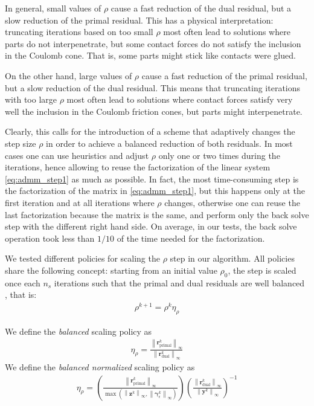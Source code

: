 \documentclass[final,3p]{elsarticle}
\newcommand{\vect}[1]{\bm{#1}}
\newcommand{\norm}[1]{\left\lVert#1\right\rVert}
\begin{document}
In general, small values of $\rho$ cause a fast reduction of the dual residual, but a slow reduction of the primal residual. This has a  physical interpretation: truncating iterations based on too small $\rho$ most often lead to solutions where parts do not interpenetrate, but some contact forces do not satisfy the inclusion in the Coulomb cone. That is, some parts might stick like contacts were glued.

On the other hand, large values of $\rho$ cause a fast reduction of the primal residual, but a slow reduction of the dual residual. This means that truncating iterations with too large $\rho$ most often lead to solutions where contact forces satisfy very well the inclusion in the Coulomb friction cones, but parts might interpenetrate.
 
Clearly, this calls for the introduction of a scheme that adaptively changes the step size $\rho$ in order to achieve a balanced reduction of both residuals.
In most cases one can use heuristics and adjust $\rho$ only one or two times during the iterations, hence allowing to reuse the factorization of the linear system \eqref{eq:admm_step1} as much as possible. In fact, the most time-consuming step is the factorization of the matrix in \eqref{eq:admm_step1}, but this happens only at the first iteration and at all iterations where $\rho$ changes, otherwise one can reuse the last factorization because the matrix is the same, and perform only the back solve step with the different right hand side. On average, in our tests, the back solve operation took less than $1/10$ of the time needed for the factorization. 

We tested different policies for scaling the $\rho$ step in our algorithm. 
All policies share the following concept: starting from an initial value $\rho_0$, the step is scaled once each $n_s$ iterations such that the primal and dual residuals are well balanced 
\cite{Wohlberg2017}, %
that is:
\begin{align}
	\rho^{k+1} = \rho^{k} \eta_\rho 
\end{align}
  
We define the \textit{balanced} scaling policy as
\begin{align}
	\eta_\rho = \frac{ \norm{\vect{r}_{\text{primal}}^{k}}_\infty }{ \norm{\vect{r}_{\text{dual}}^{k}}_\infty }  
\end{align}
We define the \textit{balanced normalized} scaling policy as
\begin{align}
	\eta_\rho = \left( \frac{\norm{\vect{r}_{\text{primal}}^{k}}_\infty}{ \max{ \left( \norm{\vect{z}^k}_\infty,\norm{\vect{\gamma}_\epsilon^k}_\infty \right) } } \right)
															\left( \frac{\norm{\vect{r}_{\text{dual}}^{k}}_\infty}  { \norm{\vect{y}^k }_\infty }  \right)^{-1}
\end{align}
\end{document}
